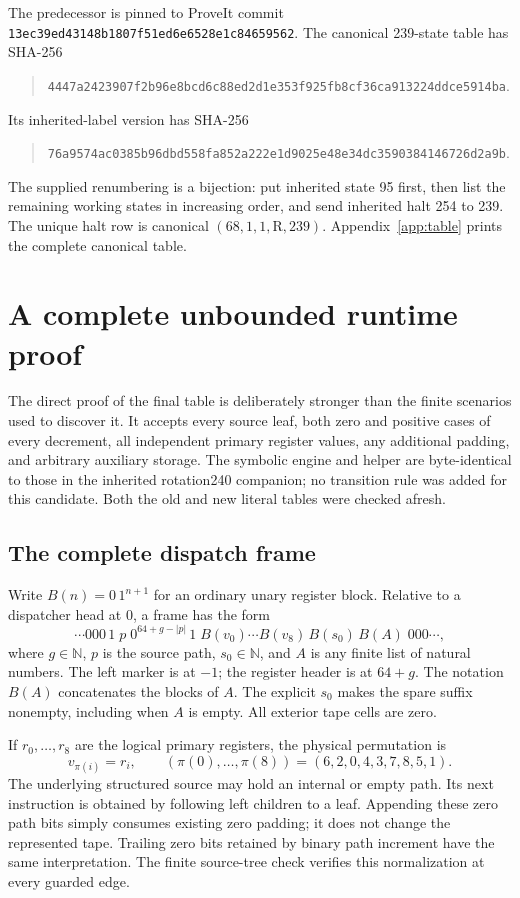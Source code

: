\documentclass[11pt,a4paper]{article}
\newcommand{\N}{\mathbb N}
\begin{document}
The predecessor is pinned to ProveIt commit
\nolinkurl{13ec39ed43148b1807f51ed6e6528e1c84659562}.
The canonical 239-state table has SHA-256
\begin{quote}\small
\nolinkurl{4447a2423907f2b96e8bcd6c88ed2d1e353f925fb8cf36ca913224ddce5914ba}.
\end{quote}
Its inherited-label version has SHA-256
\begin{quote}\small
\nolinkurl{76a9574ac0385b96dbd558fa852a222e1d9025e48e34dc3590384146726d2a9b}.
\end{quote}
The supplied renumbering is a bijection: put inherited state 95 first,
then list the remaining working states in increasing order, and send
inherited halt 254 to 239. The unique halt row is canonical
$(68,1,1,\mathrm R,239)$. Appendix~\ref{app:table} prints the complete
canonical table.



\section{A complete unbounded runtime proof}
\label{sec:runtime}

The direct proof of the final table is deliberately stronger than the
finite scenarios used to discover it. It accepts every source leaf,
both zero and positive cases of every decrement, all independent primary
register values, any additional padding, and arbitrary auxiliary storage.
The symbolic engine and helper are byte-identical to those in the
inherited rotation240 companion; no transition rule was added for this
candidate. Both the old and new literal tables were checked afresh.

\subsection{The complete dispatch frame}

Write $B(n)=0\,1^{n+1}$ for an ordinary unary register block. Relative
to a dispatcher head at 0, a frame has the form
\[
 \cdots 000\,1\;p\;0^{64+g-|p|}\,1\;
 B(v_0)\cdots B(v_8)\,B(s_0)\,B(A)\;000\cdots,
\]
where $g\in\N$, $p$ is the source path, $s_0\in\N$, and $A$ is any
finite list of natural numbers. The left marker is at $-1$; the register
header is at $64+g$. The notation $B(A)$ concatenates the blocks of $A$.
The explicit $s_0$ makes the spare suffix nonempty, including when $A$
is empty. All exterior tape cells are zero.

If $r_0,\ldots,r_8$ are the logical primary registers, the physical
permutation is
\[
 v_{\pi(i)}=r_i,\qquad
 (\pi(0),\ldots,\pi(8))=(6,2,0,4,3,7,8,5,1).
\]
The underlying structured source may hold an internal or empty path.
Its next instruction is obtained by following left children to a leaf.
Appending these zero path bits simply consumes existing zero padding;
it does not change the represented tape. Trailing zero bits retained
by binary path increment have the same interpretation. The finite
source-tree check verifies this normalization at every guarded edge.
\end{document}
